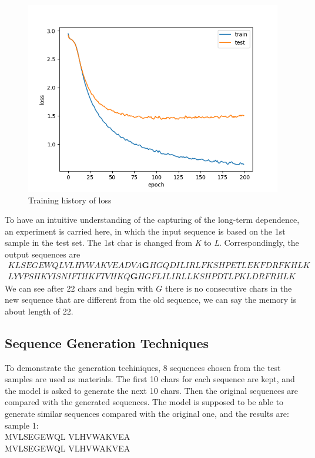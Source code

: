 \documentclass[12pt]{article}
\begin{document}
\begin{figure}[h]
    \centering
    \includegraphics [scale=0.5]{loss.png}
    \caption {Training history of loss}
\end{figure}
To have an intuitive understanding of the capturing of the long\--term
dependence, an experiment is carried here, in which the input sequence
is based on the 1st sample in the test set. The 1st char is changed
from \textit{K} to \textit{L}. Correspondingly, the output sequences are
\begin{eqnarray}
    \scriptstyle{KLSEGEWQLVLHVWAKVEADVA\bm{G}HGQDILIRLFKSHPETLEKFDRFKHLK} \\ \nonumber
    \scriptstyle{LYVPSHKYISNIFTHKFTVHKQ\bm{G}HGFLILIRLLKSHPDTLPKLDRFRHLK} \nonumber
\end{eqnarray}
We can see after 22 chars and begin with $G$ there is no consecutive chars 
in the new sequence that are different from the old sequence, we can say the 
memory is about length of 22. 

\subsection{Sequence Generation Techniques}
To demonstrate the generation techiniques, 8 sequences chosen from the
test samples are used as materials. The first 10 chars for each
sequence are kept, and the model is asked to generate the next 10 chars.
Then the original sequences are compared with the generated sequences.
The model is supposed to be able to generate similar sequences
compared with the original one, and the results are:\\
sample 1:\\
MVLSEGEWQL VLHVWAKVEA\\
MVLSEGEWQL VLHVWAKVEA\\
\end{document}
